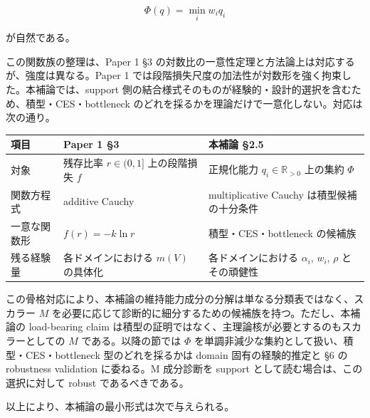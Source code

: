 \documentclass[12pt,a4paper]{article}
\begin{document}
\[
\Phi(q)=\min_{i} w_{i} q_{i}
\]

が自然である。

この関数族の整理は、Paper 1 §3 の対数比の一意性定理と方法論上は対応するが、強度は異なる。Paper 1 では段階損失尺度の加法性が対数形を強く拘束した。本補論では、support 側の結合様式そのものが経験的・設計的選択を含むため、積型・CES・bottleneck のどれを採るかを理論だけで一意化しない。対応は次の通り。

{\def\LTcaptype{table} %
\begin{longtable}[]{@{}
  >{\raggedright\arraybackslash}p{}
  >{\raggedright\arraybackslash}p{}
  >{\raggedright\arraybackslash}p{}@{}}
\toprule\noalign{}
\begin{minipage}[b]{\linewidth}\raggedright
項目
\end{minipage} & \begin{minipage}[b]{\linewidth}\raggedright
Paper 1 §3
\end{minipage} & \begin{minipage}[b]{\linewidth}\raggedright
本補論 §2.5
\end{minipage} \\
\midrule\noalign{}
\endhead
\bottomrule\noalign{}
\endlastfoot
対象 & 残存比率 \(r \in (0,1]\) 上の段階損失 \(f\) & 正規化能力 \(q_i \in \mathbb{R}_{>0}\) 上の集約 \(\Phi\) \\
関数方程式 & additive Cauchy & multiplicative Cauchy は積型候補の十分条件 \\
一意な関数形 & \(f(r) = -k \ln r\) & 積型・CES・bottleneck の候補族 \\
残る経験量 & 各ドメインにおける \(m(V)\) の具体化 & 各ドメインにおける \(\alpha_i\), \(w_i\), \(\rho\) とその頑健性 \\
\end{longtable}
}

この骨格対応により、本補論の維持能力成分の分解は単なる分類表ではなく、スカラー \(M\) を必要に応じて診断的に細分するための候補族を持つ。ただし、本補論の load-bearing claim は積型の証明ではなく、主理論核が必要とするのもスカラーとしての \(M\) である。以降の節では \(\Phi\) を単調非減少な集約として扱い、積型・CES・bottleneck 型のどれを採るかは domain 固有の経験的推定と §6 の robustness validation に委ねる。M 成分診断を support として読む場合は、この選択に対して robust であるべきである。

以上により、本補論の最小形式は次で与えられる。
\end{document}
